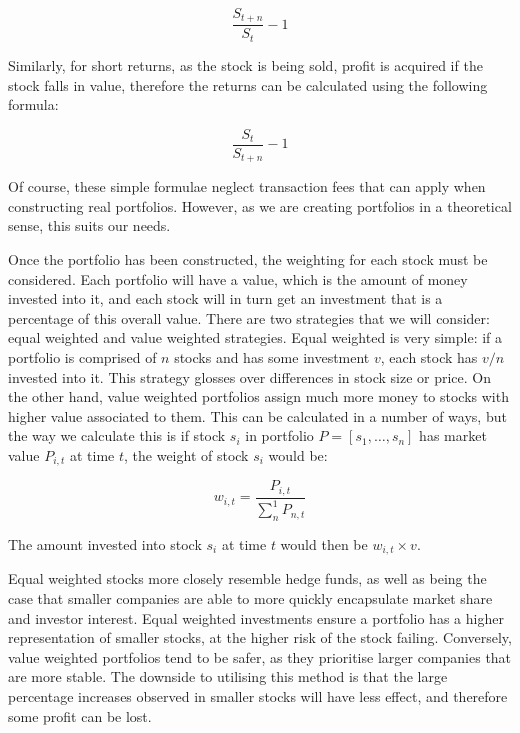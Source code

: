 \begin{equation}
\frac{S_{t+n}}{S_{t}} - 1
\end{equation}

\noindent
Similarly, for short returns, as the stock is being sold, profit is acquired if the stock falls in value, therefore the returns can be calculated using the following formula:

\begin{equation}
\frac{S_{t}}{S_{t+n}} - 1
\end{equation}

\noindent
Of course, these simple formulae neglect transaction fees that can apply when constructing real portfolios. However, as we are creating portfolios in a theoretical sense, this suits our needs.

Once the portfolio has been constructed, the weighting for each stock must be considered. Each portfolio will have a value, which is the amount of money invested into it, and each stock will in turn get an investment that is a percentage of this overall value. There are two strategies that we will consider: equal weighted and value weighted strategies. Equal weighted is very simple: if a portfolio is comprised of $n$ stocks and has some investment $v$, each stock has $v/n$ invested into it. This strategy glosses over differences in stock size or price. On the other hand, value weighted portfolios assign much more money to stocks with higher value associated to them. This can be calculated in a number of ways, but the way we calculate this is if stock $s_i$ in portfolio $P = [s_1, \dots, s_n]$ has market value $P_{i,t}$ at time $t$, the weight of stock $s_i$ would be:

\begin{equation}
w_{i,t} = \frac{P_{i,t}}{\sum_{n}^1 P_{n,t}}
\end{equation}

\noindent
The amount invested into stock $s_i$ at time $t$ would then be $w_{i,t} \times v$.

Equal weighted stocks more closely resemble hedge funds, as well as being the case that smaller companies are able to more quickly encapsulate market share and investor interest. Equal weighted investments ensure a portfolio has a higher representation of smaller stocks, at the higher risk of the stock failing. Conversely, value weighted portfolios tend to be safer, as they prioritise larger companies that are more stable. The downside to utilising this method is that the large percentage increases observed in smaller stocks will have less effect, and therefore some profit can be lost.

